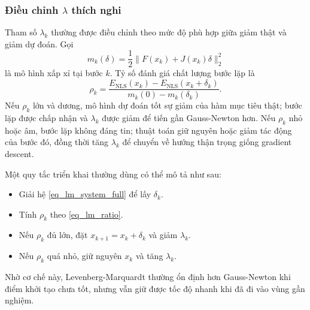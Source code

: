 \subsubsection*{Điều chỉnh $\lambda$ thích nghi}
Tham số $\lambda_k$ thường được điều chỉnh theo mức độ phù hợp giữa giảm thật và giảm dự đoán. Gọi
\begin{equation}
    m_k(\delta)
    =\frac{1}{2}\|F(x_k)+J(x_k)\delta\|_2^2
    \label{eq_lm_model}
\end{equation}
là mô hình xấp xỉ tại bước $k$. Tỷ số đánh giá chất lượng bước lặp là
\begin{equation}
    \rho_k
    =
    \frac{E_{\mathrm{NLS}}(x_k)-E_{\mathrm{NLS}}(x_k+\delta_k)}
         {m_k(0)-m_k(\delta_k)}.
    \label{eq_lm_ratio}
\end{equation}
Nếu $\rho_k$ lớn và dương, mô hình dự đoán tốt sự giảm của hàm mục tiêu thật; bước lặp được chấp nhận và $\lambda_k$ được giảm để tiến gần Gauss-Newton hơn. Nếu $\rho_k$ nhỏ hoặc âm, bước lặp không đáng tin; thuật toán giữ nguyên hoặc giảm tác động của bước đó, đồng thời tăng $\lambda_k$ để chuyển về hướng thận trọng giống gradient descent.
\medskip

Một quy tắc triển khai thường dùng có thể mô tả như sau:
\begin{itemize}
    \item Giải hệ \eqref{eq_lm_system_full} để lấy $\delta_k$.
    \item Tính $\rho_k$ theo \eqref{eq_lm_ratio}.
    \item Nếu $\rho_k$ đủ lớn, đặt $x_{k+1}=x_k+\delta_k$ và giảm $\lambda_k$.
    \item Nếu $\rho_k$ quá nhỏ, giữ nguyên $x_k$ và tăng $\lambda_k$.
\end{itemize}
\medskip

Nhờ cơ chế này, Levenberg-Marquardt thường ổn định hơn Gauss-Newton khi điểm khởi tạo chưa tốt, nhưng vẫn giữ được tốc độ nhanh khi đã đi vào vùng gần nghiệm.
